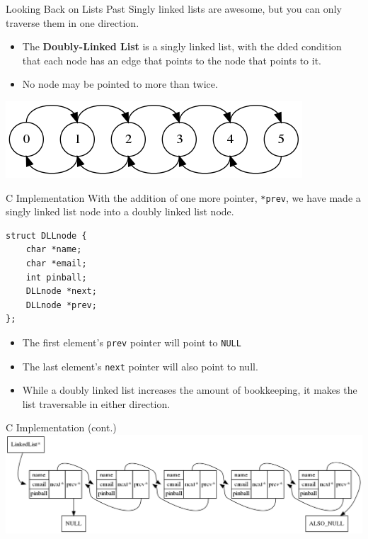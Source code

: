 \documentclass[11pt]{beamer}
\begin{document}
\begin{frame}{Looking Back on Lists Past}
Singly linked lists are awesome, but you can only traverse them in one direction. 
\begin{itemize}
\item The \textbf{Doubly-Linked List} is a singly linked list, with the dded condition that each node has an edge that points to the node that points to it.  
\item No node may be pointed to more than twice.  
\end{itemize}
\center
\includegraphics[scale=0.4]{DLL_simple.png}
\end{frame}

\begin{frame}[fragile=singleslide]{C Implementation}
With the addition of one more pointer, \texttt{*prev}, we have made a singly linked list node into a doubly linked list node.
\begin{lstlisting}[style=C]
struct DLLnode {
	char *name;
	char *email;
	int pinball;
	DLLnode *next;
	DLLnode *prev;
};
\end{lstlisting} 
\begin{itemize}
\item The first element's \texttt{prev} pointer will point to \texttt{NULL}
\item The last element's \texttt{next} pointer will also point to null.
\item While a doubly linked list increases the amount of bookkeeping, it makes the list traversable in either direction.  
\end{itemize}
\end{frame}

\begin{frame}{C Implementation (cont.)}
\center
\includegraphics[scale=0.3]{DLL.png}
\end{frame}
\end{document}

